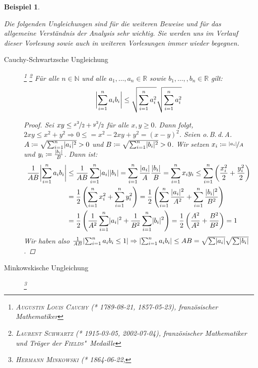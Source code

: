\documentclass[ngerman,titlepage,twoside, parskip=half*]{scrreprt}
\newcommand*{\N}{\mathbb{N}}
\newcommand*{\R}{\mathbb{R}}
\theoremstyle{break}
\theoremstyle{nonumberbreak}
\newtheorem{beispiel}{Beispiel}
\newtheorem{proof}{Beweis:}
\DeclarePairedDelimiter{\abs}{\lvert}{\rvert}
\begin{document}
\begin{beispiel}
\begin{enumerate}
\begin{enumerate}[(M1)]
    Die folgenden Ungleichungen sind für die weiteren Beweise und für das
    allgemeine Verständnis der Analysis sehr wichtig. Sie werden uns im
    Verlauf dieser Vorlesung sowie auch in weiteren Vorlesungen immer wieder
    begegnen.
    \begin{description}
    \item[Cauchy-Schwartzsche Ungleichung]\footnote{\textsc{Augustin Louis
      Cauchy} (* 1789-08-21, \textdagger{} 1857-05-23), französischer Mathematiker}
      \footnote{\textsc{Laurent Schwartz} (* 1915-03-05, \textdagger{} 2002-07-04),
	französischer Mathematiker und Träger der \textsc{Fields}"~Medaille}
      Für alle $n\in\N$ und alle $a_1 ,\ldots ,a_n \in \R$ sowie
      $b_{1},\dotsc, ,b_n \in \R$ gilt:
      \begin{gather*}
	\abs[\bigg]{\sum_{i=1}^n a_i b_i} \leq \sqrt{\sum_{i=1}^n a_i^2}
	   \sqrt{\sum_{i=1}^n a_i^2}
      \end{gather*}
      \begin{proof}
	Sei $xy \leq\nicefrac{x^2}{2}+\nicefrac{y^2}{2}$ für alle $x,y \geq
	0$. Dann folgt, $2xy\leq x^{2}+y^{2}\Rightarrow0 \leq = x^2-2xy+y^2=
	(x-y)^{2}$. Seien o.\,B.\,d.\,A. $A\coloneqq\sqrt{\sum_{i=1}^n
	\abs{a_i}^2}>0$ und $B\coloneqq\sqrt{\sum_{i=1}^n \abs{b_i}^2}>0$. Wir
	setzen $x_i \coloneqq \nicefrac{\abs{a_i}}{A}$ und  $y_i
	\coloneqq\frac{\abs{b_i}}{B}$.  Dann ist:
      \begin{align*}
        \frac{1}{AB}\abs[\bigg]{\sum_{i=1}^n a_i b_i} &\leq
	   \frac{1}{AB}\sum_{i=1}^n \abs{a_i}\abs{b_i} = \sum_{i=1}^n
	   \frac{\abs{a_i}}{A} \frac{\abs{b_i}}{B} = \sum_{i=1}^n x_i y_i
	   \leq \sum_{i=1}^n \left(\frac{x_i^2}{2}+\frac{y_i^2}{2}\right)\\
	&= \frac{1}{2}\left(\sum_{i=1}^n x_i^2 + \sum_{i=1}^n y_i^2\right) =
	   \frac{1}{2} \left( \sum_{i=1}^n \frac{\abs{a_i}^2}{A^2} +
	   \sum_{i=1}^n \frac{\abs{b_i}^2}{B^2}\right)\\
        & = \frac{1}{2} \left( \frac{1}{A^2} \sum_{i=1}^n \abs{a_i}^2 +
	   \frac{1}{B^2} \sum_{i=1}^n \abs{b_i}^2\right) = \frac{1}{2} \left(
	   \frac{A^2}{A^2} + \frac{B^2}{B^2} \right)  = 1
      \end{align*}
	Wir haben also $\frac{1}{AB}\abs{\sum_{i=1}^{n} a_{i}
	b_{i}\leq1}\Rightarrow \abs{\sum_{i=1}^{n}a_{i} b_{i}}\leq AB=
	\sqrt{\sum\abs{a_{i}}} \sqrt{\sum\abs{b_{i}}}$.
      \end{proof}
    \item[Minkowskische Ungleichung]\footnote{\textsc{Hermann Minkowski} (* 1864-06-22, \textdagger
}
\end{description}
\end{enumerate}
\end{enumerate}
\end{beispiel}
\end{document}
